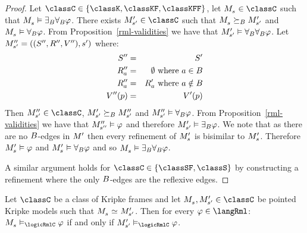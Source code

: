 \begin{proof}
Let $\classC \in \{\classK, \classKF, \classKFF\}$, let $\kPModel{\kStateS} \in \classC$ such that $\kPModel{\kStateS} \entails \somerefsBs \allrefsBs \phi$.
There exists $\kPModelP{\kStateSP} \in \classC$ such that $\kPModel{\kStateS} \simulatesBs \kPModelP{\kStateSP}$ and $\kPModel{\kStateS} \entails \allrefsBs \phi$.
From Proposition~\ref{rml-validities} we have that ${M^{\prime}_{{s}^{\prime}}} \vDash {\forall_{B}} {\forall_{B}} \varphi$.
Let $\kPModelAndTuplePP{\kStateSP}$ where:
\begin{eqnarray*}
    {S^{\prime\prime}} &=& {S^{\prime}}\\
    {R^{\prime\prime}_{a}} &=& \emptyset \text{ where } a \in B\\
    {R^{\prime\prime}_{a}} &=& {R^{\prime}_{a}} \text{ where } a \notin B\\
    {V^{\prime\prime}}(p) &=& {V^{\prime}}(p)
\end{eqnarray*}
Then $\kPModelPP{\kStateSP} \in \classC$, ${M^{\prime}_{{s}^{\prime}}} \succeq_{B} {M^{\prime\prime}_{{s}^{\prime}}}$ and ${M^{\prime\prime}_{{s}^{\prime}}} \vDash {\forall_{B}} \varphi$.
From Proposition~\ref{rml-validities} we have that ${M^{\prime\prime}_{{s}^{\prime\prime}}} \vDash \varphi$ and therefore ${M^{\prime}_{{s}^{\prime}}} \vDash {\exists_{B}} \varphi$.
We note that as there are no $B$-edges in ${M^{\prime}_{}}$ then every refinement of $\kPModelP{\kStateS}$ is bisimilar to $\kPModelP{\kStateS}$.
Therefore $\kPModelP{\kStateS} \entails \phi$ and $\kPModelP{\kStateS} \entails \allrefsBs \phi$ and so $\kPModel{\kStateS} \entails \somerefsBs \allrefsBs \phi$.

A similar argument holds for $\classC \in \{\classSF, \classS\}$ by constructing a refinement where the only $B$-edges are the reflexive edges.
\end{proof}


\begin{proposition}\label{rml-bisimulation-invariance}
Let $\classC$ be a class of Kripke frames and
let $\kPModel{\kStateS}, \kPModelP{\kStateSP} \in \classC$ be pointed Kripke models such that $\kPModel{\kStateS} \bisimilar \kPModelP{\kStateSP}$.
Then for every $\phi \in \langRml$:
$\kPModel{\kStateS} \entails_\logicRmlC \phi$ if and only if $\kPModelP{\kStateSP} \entails_\logicRmlC \phi$.
\end{proposition}

